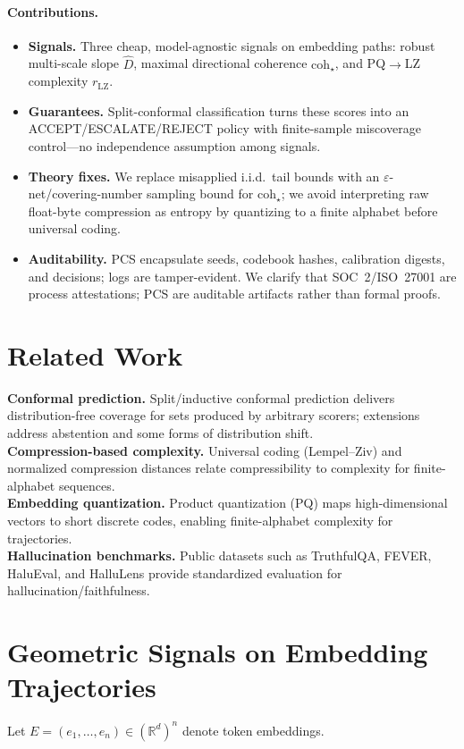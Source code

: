 \documentclass[11pt]{article}
\begin{document}
\paragraph{Contributions.}
\begin{itemize}
  \item \textbf{Signals.} Three cheap, model-agnostic signals on embedding paths: robust multi-scale slope $\hat D$, maximal directional coherence $\mathrm{coh}_\star$, and PQ$\to$LZ complexity $r_{\mathrm{LZ}}$.
  \item \textbf{Guarantees.} Split-conformal classification turns these scores into an \textsc{ACCEPT}/\textsc{ESCALATE}/\textsc{REJECT} policy with finite-sample miscoverage control---no independence assumption among signals.
  \item \textbf{Theory fixes.} We replace misapplied i.i.d.\ tail bounds with an $\varepsilon$-net/covering-number sampling bound for $\mathrm{coh}_\star$; we avoid interpreting raw float-byte compression as entropy by quantizing to a finite alphabet before universal coding.
  \item \textbf{Auditability.} PCS encapsulate seeds, codebook hashes, calibration digests, and decisions; logs are tamper-evident. We clarify that SOC~2/ISO~27001 are process attestations; PCS are auditable artifacts rather than formal proofs.
\end{itemize}

\section{Related Work}
\textbf{Conformal prediction.} Split/inductive conformal prediction delivers distribution-free coverage for sets produced by arbitrary scorers; extensions address abstention and some forms of distribution shift.\\
\textbf{Compression-based complexity.} Universal coding (Lempel--Ziv) and normalized compression distances relate compressibility to complexity for finite-alphabet sequences.\\
\textbf{Embedding quantization.} Product quantization (PQ) maps high-dimensional vectors to short discrete codes, enabling finite-alphabet complexity for trajectories.\\
\textbf{Hallucination benchmarks.} Public datasets such as TruthfulQA, FEVER, HaluEval, and HalluLens provide standardized evaluation for hallucination/faithfulness.

\section{Geometric Signals on Embedding Trajectories}
Let $E=(e_1,\dots,e_n)\in(\mathbb{R}^d)^n$ denote token embeddings.
\end{document}
